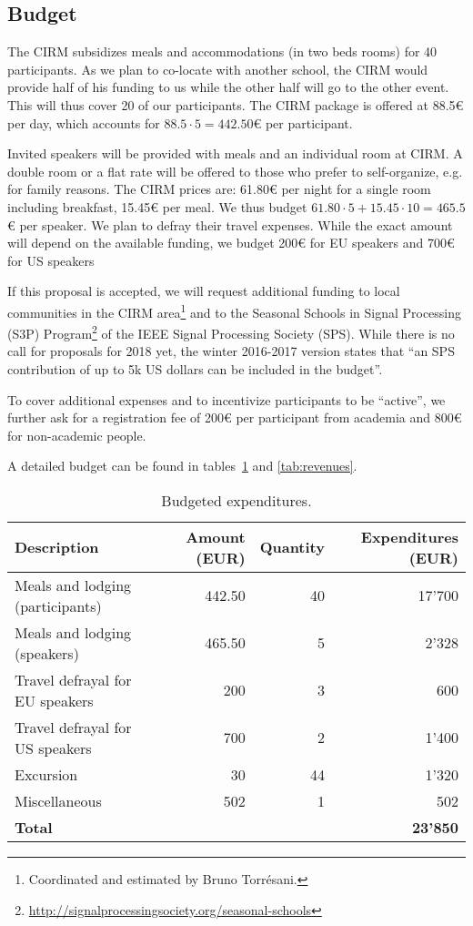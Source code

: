 \documentclass[a4paper]{scrartcl}
\begin{document}
\subsection{Budget}

The CIRM subsidizes meals and accommodations (in two beds rooms) for 40
participants. As we plan to co-locate with another school, the CIRM would
provide half of his funding to us while the other half will go to the other
event. This will thus cover 20 of our participants. The CIRM package is offered
at 88.5€ per day, which accounts for $88.5 \cdot 5 = 442.50$€ per participant.

Invited speakers will be provided with meals and an individual room at CIRM. A
double room or a flat rate will be offered to those who prefer to self-organize,
e.g. for family reasons. The CIRM prices are: 61.80€ per night for a single room
including breakfast, 15.45€ per meal. We thus budget $61.80 \cdot 5 + 15.45
\cdot 10 = 465.5$€ per speaker. We plan to defray their travel expenses. While
the exact amount will depend on the available funding, we budget 200€ for EU
speakers and 700€ for US speakers

If this proposal is accepted, we will request additional funding to local
communities in the CIRM area\footnote{Coordinated and estimated by Bruno
Torrésani.} and to the Seasonal Schools in Signal Processing (S3P)
Program\footnote{\url{http://signalprocessingsociety.org/seasonal-schools}} of
the IEEE Signal Processing Society (SPS). While there is no call for proposals
for 2018 yet, the winter 2016-2017 version states that ``an SPS contribution of
up to 5k US dollars can be included in the budget''.

To cover additional expenses and to incentivize participants to be ``active'',
we further ask for a registration fee of 200€ per participant from academia and
800€ for non-academic people.

A detailed budget can be found in tables~\ref{tab:expenditures} and
\ref{tab:revenues}.

\begin{table}[ht]
	\centering
	\begin{tabular}{|l|r|r|r|}
	\hline
	Description & Amount (EUR) & Quantity & Expenditures (EUR) \\
	\hline
	Meals and lodging (participants) &  442.50 & 40 & 17'700 \\
	Meals and lodging (speakers)     &  465.50 &  5 &  2'328 \\
	Travel defrayal for EU speakers  &  200    &  3 &    600 \\
	Travel defrayal for US speakers  &  700    &  2 &  1'400 \\
	Excursion                        &   30    & 44 &  1'320 \\
	Miscellaneous                    &  502    &  1 &    502 \\
	\hline
	\multicolumn{3}{|l|}{\textbf{Total}} & \textbf{23'850} \\
	\hline
	\end{tabular}
	\caption{Budgeted expenditures.}
	\label{tab:expenditures}
\end{table}
\end{document}
